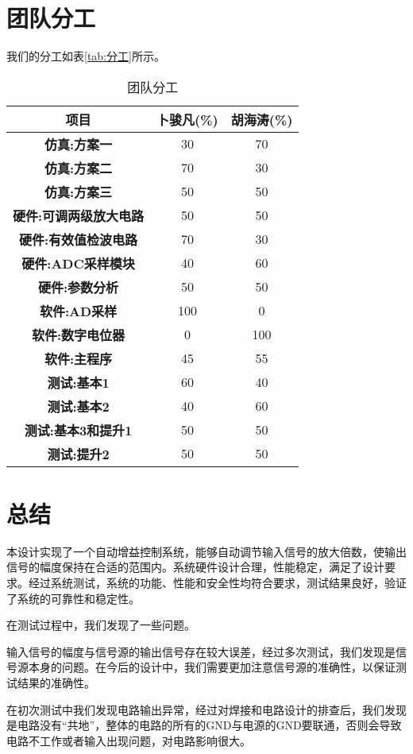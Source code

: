 \documentclass[lang=cn,11pt,a4paper]{elegantpaper}
\begin{document}
\section{团队分工}
我们的分工如表\ref{tab:分工}所示。
\begin{table}[!ht]
	\centering
	\caption{团队分工}
	\begin{tabular}{ccc}
		\textbf{项目} & \textbf{卜骏凡(\%)} & \textbf{胡海涛(\%)} \\ \hline
		\textbf{仿真:方案一} & 30 & 70 \\ 
		\textbf{仿真:方案二} & 70 & 30 \\ 
		\textbf{仿真:方案三} & 50 & 50 \\ 
		\textbf{硬件:可调两级放大电路} & 50 & 50 \\ 
		\textbf{硬件:有效值检波电路} & 70 & 30 \\ 
		\textbf{硬件:ADC采样模块} & 40 & 60 \\ 
		\textbf{硬件:参数分析} & 50 & 50 \\ 
		\textbf{软件:AD采样} & 100 & 0 \\ 
		\textbf{软件:数字电位器} & 0 & 100 \\ 
		\textbf{软件:主程序} & 45 & 55 \\ 
		\textbf{测试:基本1} & 60 & 40 \\ 
		\textbf{测试:基本2} & 40 & 60 \\ 
		\textbf{测试:基本3和提升1} & 50 & 50 \\ 
		\textbf{测试:提升2} & 50 & 50 \\ 
	\end{tabular}
	\label{分工}
\end{table}

\section{总结}
本设计实现了一个自动增益控制系统，能够自动调节输入信号的放大倍数，使输出信号的幅度保持在合适的范围内。系统硬件设计合理，性能稳定，满足了设计要求。经过系统测试，系统的功能、性能和安全性均符合要求，测试结果良好，验证了系统的可靠性和稳定性。

在测试过程中，我们发现了一些问题。

输入信号的幅度与信号源的输出信号存在较大误差，经过多次测试，我们发现是信号源本身的问题。在今后的设计中，我们需要更加注意信号源的准确性，以保证测试结果的准确性。

在初次测试中我们发现电路输出异常，经过对焊接和电路设计的排查后，我们发现是电路没有“共地”，整体的电路的所有的GND与电源的GND要联通，否则会导致电路不工作或者输入出现问题，对电路影响很大。
\end{document}
